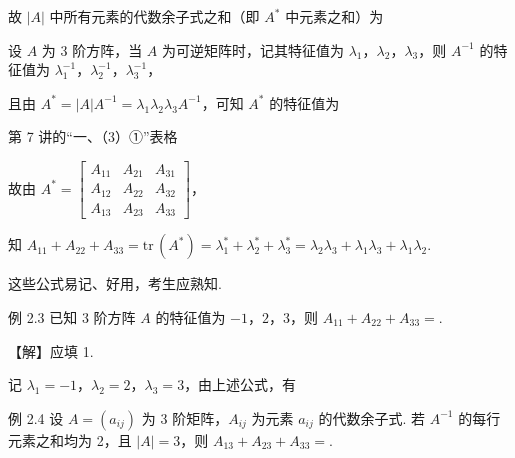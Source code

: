 故 $|A|$ 中所有元素的代数余子式之和（即 $A^{*}$ 中元素之和）为


设 $A$ 为 3 阶方阵，当 $A$ 为可逆矩阵时，记其特征值为 $\lambda_1$，$\lambda_2$，$\lambda_3$，则 $A^{-1}$ 的特征值为 $\lambda_1^{-1}$，$\lambda_2^{-1}$，$\lambda_3^{-1}$，

且由 $A^{*}=|A|A^{-1}=\lambda_1\lambda_2\lambda_3A^{-1}$，可知 $A^{*}$ 的特征值为

第 7 讲的“一、（3）①”表格

故由 $A^{*}=\begin{bmatrix}A_{11}&A_{21}&A_{31}\\A_{12}&A_{22}&A_{32}\\A_{13}&A_{23}&A_{33}\end{bmatrix}$，

知 $A_{11}+A_{22}+A_{33}=\mathrm{tr}\,(A^{*})=\lambda_1^{*}+\lambda_2^{*}+\lambda_3^{*}=\lambda_2\lambda_3+\lambda_1\lambda_3+\lambda_1\lambda_2$.

这些公式易记、好用，考生应熟知.

\begin{fcard}{例 2.3}
已知 3 阶方阵 $A$ 的特征值为 $-1$，$2$，$3$，则 $A_{11}+A_{22}+A_{33}=$\underline{\hspace{2.6em}}.
\end{fcard}

【解】应填 1.

记 $\lambda_1=-1$，$\lambda_2=2$，$\lambda_3=3$，由上述公式，有

\begin{fcard}{例 2.4}
设 $A=(a_{ij})$ 为 3 阶矩阵，$A_{ij}$ 为元素 $a_{ij}$ 的代数余子式. 若 $A^{-1}$ 的每行元素之和均为 2，且 $|A|=3$，则 $A_{13}+A_{23}+A_{33}=$\underline{\hspace{2.6em}}.
\end{fcard}

